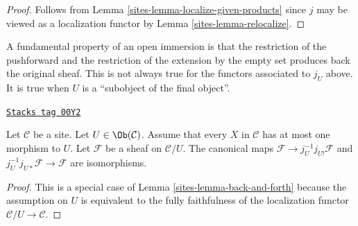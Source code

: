 \begin{proof}

Follows from Lemma \ref{sites-lemma-localize-given-products} since $j$ may be viewed
as a localization functor by Lemma \ref{sites-lemma-relocalize}.
\end{proof}

A fundamental property of an open immersion is
that the restriction of the pushforward and the restriction
of the extension by the empty set produces back the original sheaf.
This is not always true for the functors associated to $j_U$
above. It is true when $U$ is a ``subobject of the final object''.

\begin{lemma}
\label{sites-lemma-restrict-back}
\href{https://stacks.math.columbia.edu/tag/00Y2}{\texttt{Stacks tag 00Y2}}

Let $\mathcal{C}$ be a site.
Let $U \in \Ob(\mathcal{C})$.
Assume that every $X$ in $\mathcal{C}$ has at most
one morphism to $U$. Let $\mathcal{F}$ be a sheaf on $\mathcal{C}/U$.
The canonical maps $\mathcal{F} \to j_U^{-1}j_{U!}\mathcal{F}$
and $j_U^{-1}j_{U*}\mathcal{F} \to \mathcal{F}$ are
isomorphisms.
\end{lemma}

\begin{proof}

This is a special case of Lemma \ref{sites-lemma-back-and-forth}
because the assumption on $U$ is equivalent to the fully faithfulness
of the localization functor $\mathcal{C}/U \to \mathcal{C}$.
\end{proof}

